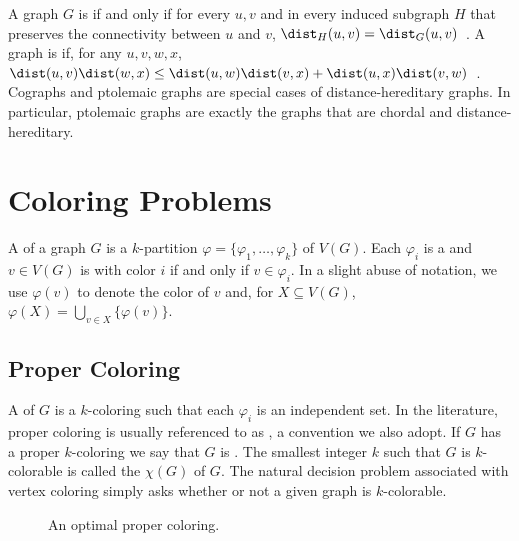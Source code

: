 A graph $G$ is  if and only if for every $u,v$ and in every induced subgraph $H$ that preserves the connectivity between $u$ and $v$, $\dist_H(u,v) = \dist_G(u,v)$~\citep{distance_hereditary}.
A graph is  if, for any $u,v,w,x$, $\dist(u,v) \dist(w,x) \leq \dist(u,w) \dist(v,x) + \dist(u,x) \dist(v,w)$~\citep{ptolemaic}.
Cographs and ptolemaic graphs are special cases of distance-hereditary graphs. In particular, ptolemaic graphs are exactly the graphs that are chordal and distance-hereditary.

\section{Coloring Problems}

A  of a graph $G$ is a $k$-partition $\varphi = \{\varphi_1, \dots,\varphi_k\}$ of $V(G)$.
Each $\varphi_i$ is a  and $v \in V(G)$ is  with color $i$ if and only if $v \in \varphi_i$.
In a slight abuse of notation, we use $\varphi(v)$ to denote the color of $v$ and, for $X \subseteq V(G)$, $\varphi(X) = \bigcup_{v \in X} \{\varphi(v)\}$.

\subsection{Proper Coloring}

A  of $G$ is a $k$-coloring such that each $\varphi_i$ is an independent set.
In the literature, proper coloring is usually referenced to as , a convention we also adopt.
If $G$ has a proper $k$-coloring we say that $G$ is .
The smallest integer $k$ such that $G$ is $k$-colorable is called the  $\chi(G)$ of $G$.
The natural decision problem associated with vertex coloring simply asks whether or not a given graph is $k$-colorable.



\begin{figure}[!htb]
    \centering
    \caption{An optimal proper coloring.}
    \label{fig:prop_color}
\end{figure}

